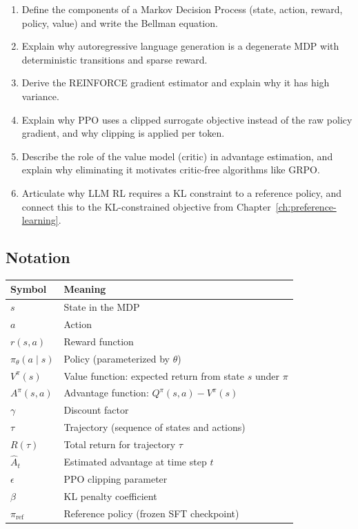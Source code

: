 \begin{enumerate}
  \item Define the components of a Markov Decision Process (state, action, reward, policy, value) and write the Bellman equation.
  \item Explain why autoregressive language generation is a degenerate MDP with deterministic transitions and sparse reward.
  \item Derive the REINFORCE gradient estimator and explain why it has high variance.
  \item Explain why PPO uses a clipped surrogate objective instead of the raw policy gradient, and why clipping is applied per token.
  \item Describe the role of the value model (critic) in advantage estimation, and explain why eliminating it motivates critic-free algorithms like GRPO.
  \item Articulate why LLM RL requires a KL constraint to a reference policy, and connect this to the KL-constrained objective from Chapter~\ref{ch:preference-learning}.
\end{enumerate}


\subsection*{Notation}

\begin{center}
\begin{tabular}{ll}
\toprule
Symbol & Meaning \\
\midrule
$s$ & State in the MDP \\
$a$ & Action \\
$r(s, a)$ & Reward function \\
$\pi_\theta(a \mid s)$ & Policy (parameterized by $\theta$) \\
$V^\pi(s)$ & Value function: expected return from state $s$ under $\pi$ \\
$A^\pi(s, a)$ & Advantage function: $Q^\pi(s,a) - V^\pi(s)$ \\
$\gamma$ & Discount factor \\
$\tau$ & Trajectory (sequence of states and actions) \\
$R(\tau)$ & Total return for trajectory $\tau$ \\
$\hat{A}_t$ & Estimated advantage at time step $t$ \\
$\epsilon$ & PPO clipping parameter \\
$\beta$ & KL penalty coefficient \\
$\pi_{\text{ref}}$ & Reference policy (frozen SFT checkpoint) \\
\bottomrule
\end{tabular}
\end{center}



